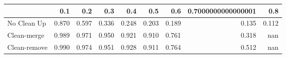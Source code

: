 \begin{tabular}{lrrrrrrrr}
\toprule
{} &   0.1 &   0.2 &   0.3 &   0.4 &   0.5 &   0.6 & 0.7000000000000001 &   0.8 \\
\midrule
No Clean Up  & 0.870 & 0.597 & 0.336 & 0.248 & 0.203 & 0.189 &              0.135 & 0.112 \\
Clean-merge  & 0.989 & 0.971 & 0.950 & 0.921 & 0.910 & 0.761 &              0.318 &   nan \\
Clean-remove & 0.990 & 0.974 & 0.951 & 0.928 & 0.911 & 0.764 &              0.512 &   nan \\
\bottomrule
\end{tabular}
